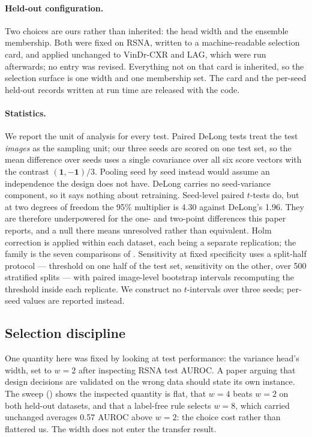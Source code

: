 \documentclass[pmlr,twocolumn,10pt]{jmlr} %
\begin{document}
\paragraph*{Held-out configuration.}
Two choices are ours rather than inherited: the head width and the ensemble membership. Both
were fixed on RSNA, written to a machine-readable selection card, and applied unchanged to
VinDr-CXR and LAG, which were run afterwards; no entry was revised. Everything not on that
card is inherited, so the selection surface is one width and one membership set. The card and
the per-seed held-out records written at run time are released with the code.

\paragraph*{Statistics.}
We report the unit of analysis for every test. Paired DeLong tests
\citep{delong1988comparing,sun2014fast} treat the test \emph{images} as the sampling unit;
our three seeds are scored on one test set, so the mean difference over seeds uses a
single covariance over all six score vectors with the contrast
$(\mathbf{1},-\mathbf{1})/3$. Pooling seed by seed instead would assume an independence the
design does not have. DeLong
carries no seed-variance component, so it says nothing about retraining. Seed-level paired
$t$-tests do, but at two degrees of freedom the 95\% multiplier is 4.30 against DeLong's
1.96. They are therefore underpowered for the one- and two-point differences this paper
reports, and a null there means unresolved rather than equivalent. Holm correction \citep{holm1979simple} is
applied within each dataset, each being a separate replication; the family is the seven
comparisons of . Sensitivity at fixed specificity uses a split-half protocol --- threshold on one half of the
test set, sensitivity on the other, over 500 stratified splits --- with paired image-level
bootstrap intervals recomputing the threshold inside each replicate. We construct no
$t$-intervals over three seeds; per-seed values are reported instead.

\subsection{Selection discipline}
\label{sec:selection}
One quantity here was fixed by looking at test performance: the variance head's width, set
to $w{=}2$ after inspecting RSNA test AUROC. A paper arguing that design decisions are
validated on the wrong data should state its own instance. The sweep
() shows the inspected quantity is flat, that $w{=}4$ beats $w{=}2$ on
both held-out datasets, and that a label-free rule selects $w{=}8$, which carried unchanged
averages 0.57 AUROC above $w{=}2$: the choice cost rather than flattered us. The width does
not enter the transfer result.
\end{document}
